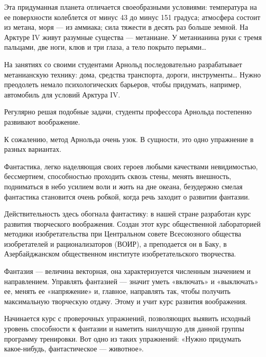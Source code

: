 Эта придуманная планета отличается своеобразными условиями: температура на
ее поверхности  колеблется от  минус 43  до минус  151 градуса;  атмосфера
состоит из метана,  моря — из  аммиака; сила тяжести  в десять раз  больше
земной. На Арктуре IV живут  разумные существа — метаниане. У  метанианина
руки с тремя пальцами, две ноги, клюв и три глаза, а тело покрыто перьями…

На занятиях  со своими  студентами Арнольд  последовательно  разрабатывает
метанианскую технику:  дома,  средства  транспорта,  дороги,  инструменты…
Нужно  преодолеть  немало   психологических  барьеров,  чтобы   придумать,
например, автомобиль для условий Арктура IV.

Регулярно решая подобные задачи,  студенты профессора Арнольда  постепенно
развивают воображение.

К сожалению, метод Арнольда очень узок. В сущности, это одно упражнение  в
разных вариантах.

Фантастика, легко наделяющая своих героев любыми качествами  невидимостью,
бессмертием,  способностью  проходить  сквозь  стены,  менять   внешность,
подниматься в небо усилием  воли и жить на  дне океана, безудержно  смелая
фантастика  становится  очень  робкой,  когда  речь  заходит  о   развитии
фантазии.

Действительность здесь обогнала фантастику: в нашей стране разработан курс
развития  творческого   воображения.   Создан   этот   курс   общественной
лабораторией методики изобретательства при Центральном совете  Всесоюзного
общества изобретателей и рационализаторов (ВОИР), а преподается он в Баку,
в Азербайджанском общественном институте изобретательского творчества.

Фантазия — величина векторная,  она характеризуется численным значением  и
направлением. Управлять фантазией — значит уметь «включать» и  «выключать»
ее, менять  ее «напряжение»  и, главное,  направлять так,  чтобы  получить
максимальную творческую отдачу. Этому и учит курс развития воображения.

Начинается курс  с проверочных  упражнений, позволяющих  выявить  исходный
уровень способности  к фантазии  и наметить  наилучшую для  данной  группы
программу тренировки.  Вот  одно  из таких  упражнений:  «Нужно  придумать
какое-нибудь, фантастическое — животное».

